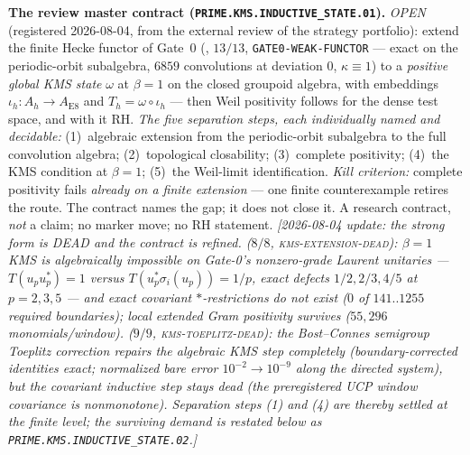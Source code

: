 \documentclass[11pt,a4paper]{article}
\begin{document}
\par\smallskip\noindent\textbf{The review master contract
(\texttt{PRIME.KMS.INDUCTIVE\_STATE.01}).}
\emph{OPEN} (registered 2026-08-04, from the external review of the
strategy portfolio): extend the finite Hecke functor of Gate~0
(, $13/13$,
\texttt{GATE0-WEAK-FUNCTOR} --- exact on the periodic-orbit
subalgebra, $6859$ convolutions at deviation $0$, $\kappa\equiv1$) to
a \emph{positive global KMS state} $\omega$ at $\beta=1$ on the
closed groupoid algebra, with embeddings
$\iota_h\colon A_h\to A_{\mathrm{E8}}$ and
$T_h=\omega\circ\iota_h$ --- then Weil positivity follows for the
dense test space, and with it RH.  \emph{The five separation steps,
each individually named and decidable:} (1)~algebraic extension from
the periodic-orbit subalgebra to the full convolution algebra;
(2)~topological closability; (3)~complete positivity; (4)~the KMS
condition at $\beta=1$; (5)~the Weil-limit identification.
\emph{Kill criterion:} complete positivity fails \emph{already on a
finite extension} --- one finite counterexample retires the route.
The contract names the gap; it does not close it.  A research
contract, \emph{not} a claim; no marker move; no RH statement.
\emph{[2026-08-04 update: the strong form is DEAD and the contract is
refined.   ($8/8$,
\textsc{kms-extension-dead}): $\beta=1$ KMS is algebraically
impossible on Gate-0's nonzero-grade Laurent unitaries ---
$T(u_pu_p^*)=1$ versus $T(u_p^*\sigma_i(u_p))=1/p$, exact defects
$1/2,2/3,4/5$ at $p=2,3,5$ --- and exact covariant
$*$-restrictions do not exist ($0$ of $141..1255$ required
boundaries); local extended Gram positivity survives
($55{,}296$ monomials/window).
 ($9/9$,
\textsc{kms-toeplitz-dead}): the Bost--Connes semigroup Toeplitz
correction repairs the algebraic KMS step \emph{completely}
(boundary-corrected identities exact; normalized bare error
$10^{-2}\to10^{-9}$ along the directed system), but the covariant
inductive step stays dead (the preregistered UCP window covariance
is nonmonotone).  Separation steps (1) and (4) are thereby settled
at the finite level; the surviving demand is restated below as
\texttt{PRIME.KMS.INDUCTIVE\_STATE.02}.]}
\end{document}
